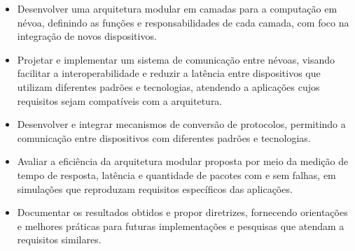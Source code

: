 \begin{itemize}
  \item Desenvolver uma arquitetura modular em camadas para a computação em névoa, definindo as funções e responsabilidades de cada camada, com foco na integração de novos dispositivos.
  
  \item Projetar e implementar um sistema de comunicação entre névoas, visando facilitar a interoperabilidade e reduzir a latência entre dispositivos que utilizam diferentes padrões e tecnologias, atendendo a aplicações cujos requisitos sejam compatíveis com a arquitetura.

  \item Desenvolver e integrar mecanismos de conversão de protocolos, permitindo a comunicação entre dispositivos com diferentes padrões e tecnologias.

  \item Avaliar a eficiência da arquitetura modular proposta por meio da medição de tempo de resposta, latência e quantidade de pacotes com e sem falhas, em simulações que reproduzam requisitos específicos das aplicações.

  \item Documentar os resultados obtidos e propor diretrizes, fornecendo orientações e melhores práticas para futuras implementações e pesquisas que atendam a requisitos similares.
\end{itemize}
